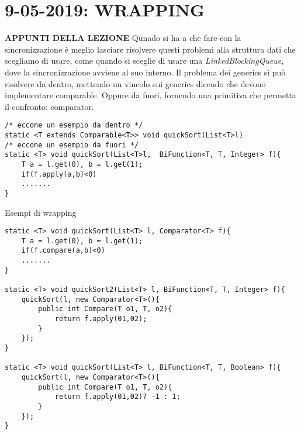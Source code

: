 

\newpage
\section{9-05-2019: WRAPPING}
\noindent \textbf{APPUNTI DELLA LEZIONE} \newline
Qunado si ha a che fare con la sincronizzazione è meglio lasciare risolvere questi problemi alla struttura dati che scegliamo di usare, come quando si sceglie di usare una \textit{LinkedBlockingQueue}, dove la sincronizzazione avviene al suo interno. \newline
Il problema dei generics si può risolvere da dentro, mettendo un vincolo sui generics dicendo che devono implementare comparable. Oppure da fuori, fornendo una primitiva che permetta il confronto: comparator. \newline
\begin{lstlisting}
/* eccone un esempio da dentro */
static <T extends Comparable<T>> void quickSort(List<T>l)
/* eccone un esempio da fuori */
static <T> void quickSort(List<T>l,  BiFunction<T, T, Integer> f){
	T a = l.get(0), b = l.get(1);
	if(f.apply(a,b)<0)
	.......
}
\end{lstlisting}

\noindent Esempi di wrapping
\begin{lstlisting}
static <T> void quickSort(List<T> l, Comparator<T> f){
	T a = l.get(0), b = l.get(1);
	if(f.compare(a,b)<0)
	.......
}

static <T> void quickSort2(List<T> l, BiFunction<T, T, Integer> f){
	quickSort(l, new Comparator<T>(){
		public int Compare(T o1, T, o2){
			return f.apply(01,02);
		}
	});
}

static <T> void quickSort(List<T> l, BiFunction<T, T, Boolean> f){
	quickSort(l, new Comparator<T>(){
		public int Compare(T o1, T, o2){
			return f.apply(01,02)? -1 : 1;
		}
	});
}

\end{lstlisting}


